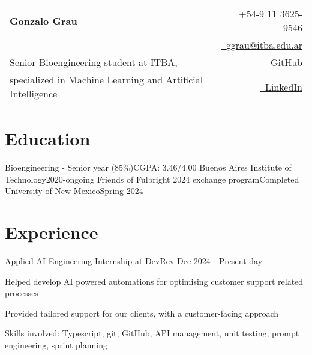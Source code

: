 \documentclass{resume}
\makeatletter
\newcommand{\name}{Gonzalo Grau} %
\renewcommand{\phone}{9 11 3625-9546} %
\newcommand{\emaila}{ggrau@itba.edu.ar} %
\makeatother
\begin{document}
    \selectfont

    {
        \begin{tabularx}{\linewidth}{L r}
            \\
            \textbf{\Huge \name} & {\raisebox{0.0\height}{\footnotesize \faPhone}\ +54-\phone}\\
            & \href{mailto:\emaila}{\raisebox{0.0\height}{\footnotesize \faEnvelope}\ {\emaila}} \\
            Senior Bioengineering student at ITBA, &
            \href{https://github.com/gonzagrau}{\raisebox{0.0\height}{\footnotesize \faGithub}\ {GitHub}} \\
            specialized in Machine Learning and Artificial Intelligence &
            \href{https://www.linkedin.com/in/gonzalo-grau/}
            {\raisebox{0.0\height}{\footnotesize \faLinkedin}\ {LinkedIn}}
        \end{tabularx}
    }




    \section{\textbf{Education}} \label{sec:education}
    \resumeSubHeadingListStart
    \resumeSubheading
    {Bioengineering - Senior year (85\%)}{CGPA: 3.46/4.00}
    {Buenos Aires Institute of Technology}{2020-ongoing}
    \resumeSubheading
    {Friends of Fulbright 2024 exchange program}{Completed}
    {University of New Mexico}{Spring 2024}
    \resumeSubHeadingListEnd

    \vspace{-5mm}


    \section{\textbf{Experience}} \label{sec:experience}
    \resumeSubHeadingListStart
    \resumeSubheading
    {Applied AI Engineering Internship at DevRev}
    {}{}{Dec 2024 - Present day}
    \vspace{-5mm}
    \resumeItemListStart
    \item
    {Helped develop AI powered automations for optimising
    customer support related processes}
    \item {Provided tailored support for our clients, with a customer-facing approach}
    \item {Skills involved: Typescript, git, GitHub, API management, unit testing, prompt engineering, sprint planning}
    \resumeItemListEnd
\end{document}
